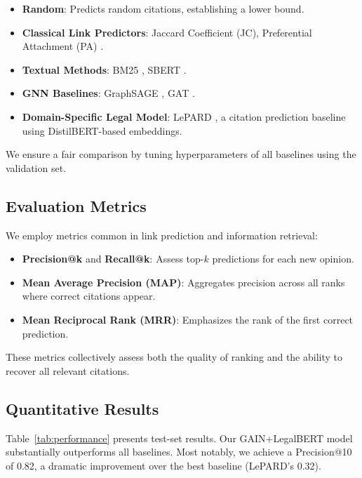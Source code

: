 \documentclass{article}
\begin{document}
\begin{itemize}[leftmargin=*]
    \item \textbf{Random}: Predicts random citations, establishing a lower bound.
    \item \textbf{Classical Link Predictors}: Jaccard Coefficient (JC), Preferential Attachment (PA) \citep{liben2007link}.
    \item \textbf{Textual Methods}: BM25 \citep{robertson2009probabilistic}, SBERT \citep{reimers2019sentence}.
    \item \textbf{GNN Baselines}: GraphSAGE \citep{hamilton2018inductive}, GAT \citep{velivckovic2018graph}.
    \item \textbf{Domain-Specific Legal Model}: LePARD \citep{mahari2022lepard}, a citation prediction baseline using DistilBERT-based embeddings.
\end{itemize}

We ensure a fair comparison by tuning hyperparameters of all baselines using the validation set.

\subsection{Evaluation Metrics}
We employ metrics common in link prediction and information retrieval:
\begin{itemize}[leftmargin=*]
    \item \textbf{Precision@k} and \textbf{Recall@k}: Assess top-$k$ predictions for each new opinion.
    \item \textbf{Mean Average Precision (MAP)}: Aggregates precision across all ranks where correct citations appear.
    \item \textbf{Mean Reciprocal Rank (MRR)}: Emphasizes the rank of the first correct prediction.
\end{itemize}

These metrics collectively assess both the quality of ranking and the ability to recover all relevant citations.

\subsection{Quantitative Results}
Table~\ref{tab:performance} presents test-set results. Our GAIN+LegalBERT model substantially outperforms all baselines. Most notably, we achieve a Precision@10 of 0.82, a dramatic improvement over the best baseline (LePARD’s 0.32).
\end{document}
